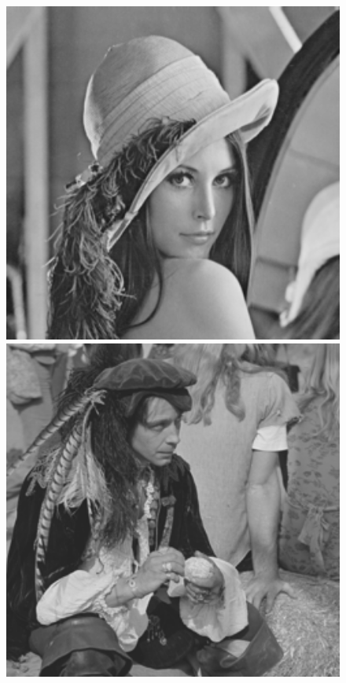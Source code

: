 \documentclass[runningheads]{llncs}
\begin{document}
\begin{figure}[t]
{\begin{minipage}{0.09\textwidth}
\end{minipage}
\begin{minipage}{0.09\textwidth}
\includegraphics[width=1.06\textwidth]{lena.png}
\end{minipage}
\begin{minipage}{0.09\textwidth}
\includegraphics[width=1.06\textwidth]{man.png}

\end{minipage}}
\end{figure}
\end{document}

